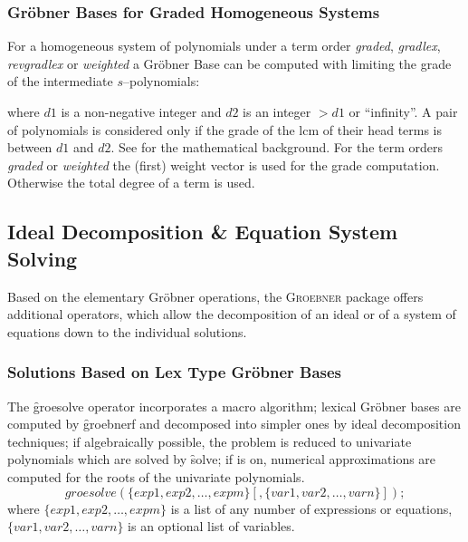 \subsubsection{Gr\"obner Bases for Graded Homogeneous Systems}

For a homogeneous system of polynomials under a term order
\textit{graded}, \textit{gradlex}, \textit{revgradlex} or \textit{weighted}
a Gr\"obner Base can be computed with limiting the grade
of the intermediate $s$--polynomials:
\begin{description}
\item[\f{dd\_groebner}($d1,d2,\{p_1,p_2,\ldots\}$);]
  \hypertarget{operator:DD_GROEBNER}{}
\end{description}
where $d1$ is a non-negative integer and $d2$ is an integer
$>d1$ or ``infinity''. A pair of polynomials is considered
only if the grade of the lcm of their head terms is between
$d1$ and $d2$. See \cite{Becker:93} for the mathematical background.
For the term orders \textit{graded} or \textit{weighted} the (first) weight
vector is used for the grade computation. Otherwise the total
degree of a term is used.

\subsection{Ideal Decomposition \& Equation System Solving}
Based on the elementary Gr\"obner operations, the \textsc{Groebner} package offers
additional operators, which allow the decomposition of an ideal or of a
system of equations down to the individual solutions.

\subsubsection{Solutions Based on Lex Type Gr\"obner Bases}

 
\hypertarget{operator:GROESOLVE}{}
The \f{groesolve} operator incorporates a macro algorithm;
lexical Gr\"obner bases are computed by \f{groebnerf} and decomposed
into simpler ones by ideal decomposition techniques; if algebraically
possible, the problem is reduced to univariate polynomials which are
solved by \f{solve}; if  is on, numerical approximations are
computed for the roots of the univariate polynomials.
\[
 groesolve(\{exp1, exp2, \ldots , expm\}[,\{var1, var2, \ldots ,
varn\}]); \]
where $\{exp1, exp2,\ldots , expm\}$ is a list of any number of
expressions or equations, $\{var1, var2, \ldots , varn\}$ is an
optional list of variables.

